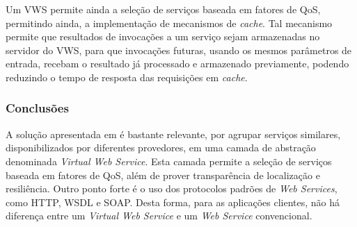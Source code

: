 Um VWS permite ainda a seleção de serviços baseada em fatores de QoS, permitindo ainda, a implementação de mecanismos de \textit{cache}. Tal mecanismo permite que resultados de invocações a um serviço sejam armazenadas no servidor do VWS, para que invocações futuras, usando os mesmos parâmetros de entrada, recebam o resultado já processado e armazenado previamente, podendo reduzindo o tempo de resposta das requisições em \textit{cache}.

\subsubsection{Conclusões}

A solução apresentada em \cite{vilas2007providing} é bastante relevante, por agrupar serviços similares, disponibilizados por diferentes provedores, em uma camada de abstração denominada \textit{Virtual Web Service}. Esta camada permite a seleção de serviços baseada em fatores de QoS, além de prover transparência de localização e resiliência. Outro ponto forte é o uso dos protocolos padrões de \textit{Web Services}, como HTTP, WSDL e SOAP. Desta forma, para as aplicações clientes, não há diferença entre um \textit{Virtual Web Service} e um \textit{Web Service} convencional.
